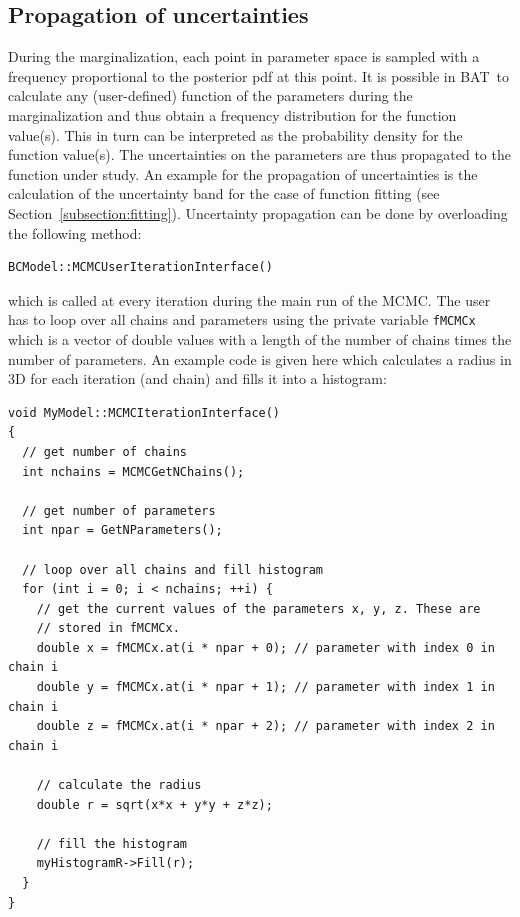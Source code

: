 \documentclass[11pt, a4paper]{article}
\newcommand{\bat}{{\sc BAT}}
\begin{document}

\subsection{Propagation of uncertainties}

During the marginalization, each point in parameter space is sampled
with a frequency proportional to the posterior pdf at this point. It
is possible in \bat\ to calculate any (user-defined) function of the
parameters during the marginalization and thus obtain a frequency
distribution for the function value(s). This in turn can be
interpreted as the probability density for the function value(s). The
uncertainties on the parameters are thus propagated to the function
under study. An example for the propagation of uncertainties is the
calculation of the uncertainty band for the case of function fitting
(see Section~\ref{subsection:fitting}).  Uncertainty propagation can
be done by overloading the following method:
%
\begin{verbatim}
BCModel::MCMCUserIterationInterface()
\end{verbatim}
%
which is called at every iteration during the main run of the
MCMC. The user has to loop over all chains and parameters using the
private variable \verb|fMCMCx| which is a vector of double values with
a length of the number of chains times the number of parameters. An
example code is given here which calculates a radius in 3D for each
iteration (and chain) and fills it into a histogram:

\begin{verbatim}
void MyModel::MCMCIterationInterface()
{
  // get number of chains
  int nchains = MCMCGetNChains();

  // get number of parameters
  int npar = GetNParameters();

  // loop over all chains and fill histogram
  for (int i = 0; i < nchains; ++i) {
    // get the current values of the parameters x, y, z. These are
    // stored in fMCMCx.
    double x = fMCMCx.at(i * npar + 0); // parameter with index 0 in chain i
    double y = fMCMCx.at(i * npar + 1); // parameter with index 1 in chain i
    double z = fMCMCx.at(i * npar + 2); // parameter with index 2 in chain i

    // calculate the radius
    double r = sqrt(x*x + y*y + z*z); 

    // fill the histogram
    myHistogramR->Fill(r);
  }
}
\end{verbatim}
\end{document}
